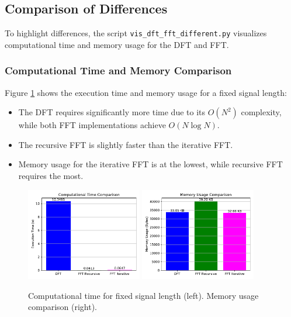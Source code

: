 \documentclass[12pt, a4paper]{report}
\begin{document}
\subsection{Comparison of Differences}
To highlight differences, the script \texttt{vis\_dft\_fft\_different.py} visualizes computational time and memory usage for the \ac{DFT} and \ac{FFT}.

\subsubsection{Computational Time and Memory Comparison}
Figure \ref{fig:time_memory_comparison} shows the execution time and memory usage for a fixed signal length:
\begin{itemize}
	\item The \ac{DFT} requires significantly more time due to its \(O(N^2)\) complexity, while both \ac{FFT} implementations achieve \(O(N \log N)\).
	\item The recursive \ac{FFT} is slightly faster than the iterative \ac{FFT}.
	\item Memory usage for the iterative \ac{FFT} is at the lowest, while recursive \ac{FFT} requires the most.
\end{itemize}

\begin{figure}[h!]
	\centering
	\includegraphics[width=0.45\textwidth]{figures/computional_time.pdf}
	\includegraphics[width=0.45\textwidth]{figures/memory_usage.pdf}
	\caption{Computational time for fixed signal length (left). Memory usage comparison (right).}
	\label{fig:time_memory_comparison}
\end{figure}
\end{document}
